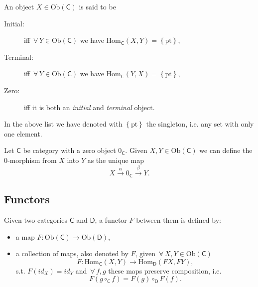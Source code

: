\begin{defn}
	An object $X \in \mathrm{Ob} \left(\mathsf{C}\right)$ is said to be
	\begin{description}
		\item[Initial:] iff $\,\forall\, Y \in \mathrm{Ob} \left(\mathsf{C}\right)$ we have $\mathrm{Hom}_{\mathsf{C}} \left( X, Y \right) = \left\{ \mathrm{pt} \right\}$,
		\item[Terminal:] iff $\,\forall\, Y \in \mathrm{Ob} \left(\mathsf{C}\right)$ we have $\mathrm{Hom}_{\mathsf{C}} \left( Y, X \right) = \left\{ \mathrm{pt} \right\}$,
		\item[Zero:] iff it is both an {\em initial} and {\em terminal} object.
	\end{description} 
	In the above list we have denoted with $\left\{ \mathrm{pt} \right\}$ the singleton, i.e. any set with only one element.
\end{defn}

\begin{defn}
	Let $\mathsf{C}$ be category with a zero object $0_{\mathsf{C}}$.
	Given $X, Y \in \mathrm{Ob} \left(\mathsf{C}\right)$ we can define the
	$0$-morphism from $X$ into $Y$ as the unique map
	\begin{equation}
		X \xrightarrow{\alpha} 0_{\mathsf{C}} \xrightarrow{\beta} Y
	.\end{equation} 
\end{defn}

\subsection{Functors}

\begin{defn}[Functor]
	Given two categories $\mathsf{C}$ and $\mathsf{D}$, a functor $F$ between them is defined by:
	\begin{itemize}
		\item a map $F\colon \mathrm{Ob} \left(\mathsf{C}\right) \to \mathrm{Ob} \left(\mathsf{D}\right)$,
		\item a collection of maps, also denoted by $F$, given $\,\forall\, X,Y \in \mathrm{Ob} \left(\mathsf{C}\right)$
			\begin{equation}
			F\colon \mathrm{Hom}_{\mathsf{C}} \left( X, Y \right) \to \mathrm{Hom}_{\mathsf{D}} \left( FX, FY \right) 
			,\end{equation} 
			s.t. $F(id_X) = id_Y$ and $\,\forall\, f,g$ these maps preserve composition, i.e. 
			\begin{equation}
			 F \left( g \circ_{\mathsf{C}} f \right) = F(g) \circ_{\mathsf{D}} F(f)
			.\end{equation}
	\end{itemize}
\end{defn}

